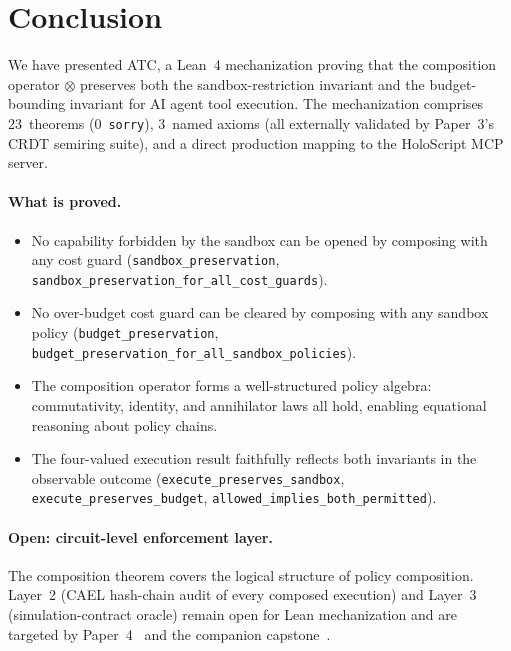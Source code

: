 \documentclass[sigconf]{acmart}
\newcommand{\compose}{\mathbin{\otimes}}
\newcommand{\ATC}{\textsc{ATC}}
\begin{document}
\section{Conclusion}
\label{sec:conclusion}

We have presented \ATC{}, a Lean~4 mechanization proving that the composition
operator $\compose$ preserves both the sandbox-restriction invariant and the
budget-bounding invariant for AI agent tool execution.  The mechanization
comprises 23~theorems (0~\texttt{sorry}), 3~named axioms (all externally
validated by Paper~3's CRDT semiring suite), and a direct production mapping
to the HoloScript MCP server.

\paragraph{What is proved.}
\begin{itemize}
  \item No capability forbidden by the sandbox can be opened by composing with
        any cost guard (\texttt{sandbox\_preservation},
        \texttt{sandbox\_preservation\_for\_all\_cost\_guards}).
  \item No over-budget cost guard can be cleared by composing with any sandbox
        policy (\texttt{budget\_preservation},
        \texttt{budget\_preservation\_for\_all\_sandbox\_policies}).
  \item The composition operator forms a well-structured policy algebra:
        commutativity, identity, and annihilator laws all hold, enabling
        equational reasoning about policy chains.
  \item The four-valued execution result faithfully reflects both invariants in
        the observable outcome (\texttt{execute\_preserves\_sandbox},
        \texttt{execute\_preserves\_budget},
        \texttt{allowed\_implies\_both\_permitted}).
\end{itemize}

\paragraph{Open: circuit-level enforcement layer.}
The composition theorem covers the logical structure of policy composition.
Layer~2 (CAEL hash-chain audit of every composed execution) and Layer~3
(simulation-contract oracle) remain open for Lean mechanization and are
targeted by Paper~4~\cite{paper-4-sandbox-usenix} and the companion
capstone~\cite{trust-by-construction}.
\end{document}
